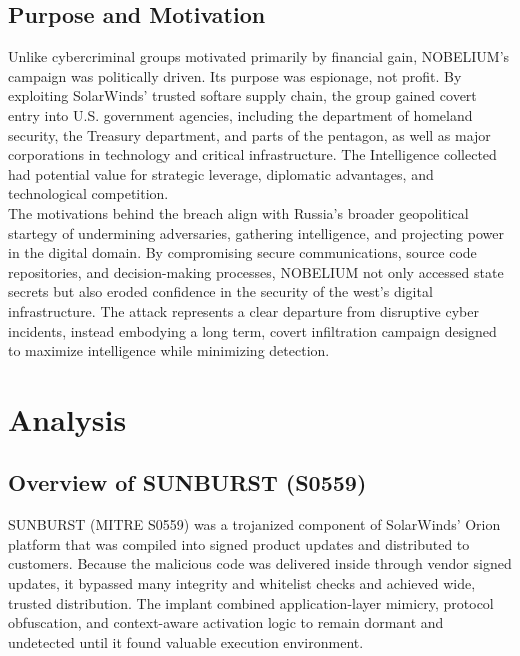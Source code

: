 \documentclass[conference]{IEEEtran}
\begin{document}
\subsection{Purpose and Motivation}
Unlike cybercriminal groups motivated primarily by financial gain\cite{CoreTech2022Motivations}, NOBELIUM's campaign was politically driven. Its purpose was espionage, not profit. By exploiting SolarWinds'
trusted softare supply chain, the group gained covert entry into U.S. government agencies, including the department of homeland security, the Treasury department, and parts of the
pentagon, as well as major corporations in technology and critical infrastructure. The Intelligence collected had potential value for strategic leverage, diplomatic advantages, and technological competition.
\\
The motivations behind the breach align with Russia's broader geopolitical startegy of undermining adversaries, gathering intelligence, and projecting power in the digital domain\cite{HakalaMelnychuk2021RussiaCyberStrategy}.
By compromising secure communications, source code repositories, and decision-making processes, NOBELIUM not only accessed state secrets but also eroded confidence in the security of the west's digital
infrastructure. The attack represents a clear departure from disruptive cyber incidents, instead embodying a long term, covert infiltration campaign designed to maximize intelligence while minimizing detection.




\section{Analysis}
\subsection{Overview of SUNBURST (S0559)}
SUNBURST (MITRE S0559) was a trojanized component of SolarWinds' Orion platform that was compiled into
signed product updates and distributed to customers. Because the malicious code was delivered inside through vendor signed updates, it bypassed many integrity and whitelist checks
and achieved wide, trusted distribution. The implant combined application-layer mimicry, protocol obfuscation, and context-aware activation logic to remain dormant and undetected
until it found valuable execution environment.
\end{document}
